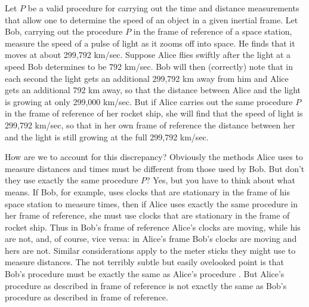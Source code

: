 Let $P$ be a valid procedure for carrying out the time and distance measurements that allow one to determine the speed of an object in a given inertial frame. Let Bob, carrying out the procedure $P$ in the frame of reference of a space station, measure the speed of a pulse of light as it zooms off into space. He finds that it moves at about 299,792 km/sec. Suppose Alice flies swiftly after the light at a speed Bob determines to be 792 km/sec. Bob will then (correctly) note that in each second the light gets an additional 299,792 km away from him and Alice gets an additional 792 km away, so that the distance between Alice and the light is growing at only 299,000 km/sec. But if Alice carries out the same procedure $P$ in the frame of reference of her rocket ship, she will find that the speed of light is 299,792 km/sec, so that in her own frame of reference the distance between her and the light is still growing at the full 299,792 km/sec. 

How are we to account for this discrepancy? Obviously the methods Alice uses to measure distances and times must be different from those used by Bob. But don't they use exactly the same procedure $P$? Yes, but you have to think about what  means. If Bob, for example, uses clocks that are stationary in the frame of his space station to measure times, then if Alice uses exactly the same procedure in her frame of reference, she must use clocks that are stationary in the frame of  rocket ship. Thus in Bob's frame of reference Alice's clocks are moving, while his are not, and, of course, vice versa: in Alice's frame Bob's clocks are moving and hers are not. Similar considerations apply to the meter sticks they might use to measure distances. The not terribly subtle but easily ovelooked point is that Bob's procedure  must be exactly the same as Alice's procedure . But Alice's procedure as described in  frame of reference is not exactly the same as Bob's procedure as described in  frame of reference.

